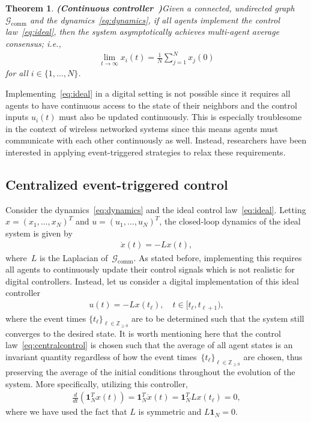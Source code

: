 \documentclass{autart}
\newtheorem{theorem}{Theorem}[section]
\newcommand{\integernonnegative}{\mathbb{Z}_{\ge 0}}
\newcommand{\GG}{{\mathcal{G}}}
\newcommand{\ones}[1]{\mathbf{1}_{#1}}
\newcommand{\until}[1]{\{1,\dots, #1\}}
\newcommand{\commgraph}{\GG_\text{comm}}
\newcommand{\longthmtitle}[1]{\mbox{}\textup{\textbf{(#1)}}}
\begin{document}
\begin{theorem}\longthmtitle{Continuous
    controller~\citep{ROS-RMM:03c}}\label{th:main}
  Given {a connected, undirected graph~$\commgraph$ and} the
  dynamics~\eqref{eq:dynamics}, if all agents implement the control
  law~\eqref{eq:ideal}, then the system asymptotically achieves
  multi-agent average consensus; i.e.,
  \begin{align}\label{eq:averageconsensus}
    \lim_{t \rightarrow \infty} x_i(t) = \frac{1}{N} \sum_{j=1}^N
    x_j(0)
  \end{align}
  for all $i \in \until{N}$.
\end{theorem}

Implementing~\eqref{eq:ideal} in a digital setting is not possible
since it requires all agents to have continuous access to the state of
their neighbors and the control inputs $u_i(t)$ must also be updated
continuously. This is especially troublesome in the context of
wireless networked systems since this means agents must communicate with
each other continuously as well. Instead, researchers have been
interested in applying event-triggered strategies to relax these requirements.

\subsection{Centralized event-triggered control}

Consider the dynamics~\eqref{eq:dynamics} and the ideal control
law~\eqref{eq:ideal}.  Letting $x = (x_1, \dots, x_N)^T$ and
$u = (u_1, \dots, u_N)^T$, the closed-loop dynamics of the ideal
system is given by
\begin{align}\label{eq:idealfull}
  \dot{x}(t) = -Lx(t) ,
\end{align}
where~$L$ is the Laplacian of~$\commgraph$.  As stated before,
implementing this requires all agents to continuously update their
control signals which is not realistic for digital
controllers. Instead, let us consider a digital implementation of this
ideal controller
\begin{align}\label{eq:centralcontrol}
  u(t) = -Lx(t_\ell), \quad t \in [t_\ell, t_{\ell+1} ),
\end{align}
where the event times $\{ t_\ell \}_{\ell \in \integernonnegative}$
are to be determined such that the system still converges to the
desired state. It is worth mentioning here that the control
law~\eqref{eq:centralcontrol} is chosen such that the average of all
agent states is an invariant quantity regardless of how the event
times~$\{t_\ell\}_{\ell \in \integernonnegative}$ are chosen, thus
preserving the average of the initial conditions throughout the
evolution of the system.  More specifically, utilizing this
controller,
\begin{align}\label{eq:average-preservation}
  \frac{d}{dt} (\ones{N}^T x(t)) = \ones{N}^T \dot x(t) = \ones{N}^T L
  x(t_\ell) = 0 ,
\end{align}
where we have used the fact that $L$ is symmetric and
$L \ones{N} = 0$.
\end{document}
